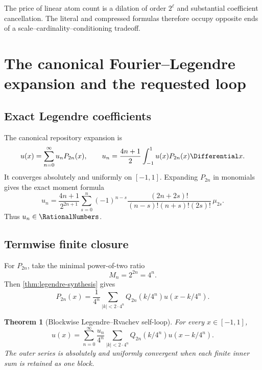 \documentclass[11pt,oneside]{article}
\numberwithin{equation}{section}
\newtheorem{theorem}{Theorem}[section]
\theoremstyle{definition}
\theoremstyle{remark}
\begin{document}
The price of linear atom count is a dilation of order $2^\ell$ and substantial
coefficient cancellation.  The literal and compressed formulas therefore
occupy opposite ends of a scale--cardinality--conditioning tradeoff.

\section{The canonical Fourier--Legendre expansion and the requested loop}
\label{sec:canonical-loop}

\subsection{Exact Legendre coefficients}

The canonical repository expansion is
\begin{equation}
 u(x)=\sum_{n=0}^{\infty}u_nP_{2n}(x),
 \qquad
 u_n=\frac{4n+1}{2}\int_{-1}^{1}u(x)P_{2n}(x)\Differential x.
 \label{eq:canonical-expansion}
\end{equation}
It converges absolutely and uniformly on $[-1,1]$.  Expanding $P_{2n}$ in
monomials gives the exact moment formula
\begin{equation}
 \boxed{
 u_n=\frac{4n+1}{2^{2n+1}}
 \sum_{s=0}^{n}(-1)^{n-s}
 \frac{(2n+2s)!}{(n-s)!(n+s)!(2s)!}\,\mu_{2s}.}
 \label{eq:un-moments}
\end{equation}
Thus $u_n\in\RationalNumbers$.

\begin{center}
\small

\end{center}

\subsection{Termwise finite closure}

For $P_{2n}$, take the minimal power-of-two ratio
\begin{equation}
 M_n=2^{2n}=4^n.
 \label{eq:Mn}
\end{equation}
Then \cref{thm:legendre-synthesis} gives
\begin{equation}
 P_{2n}(x)=\frac1{4^n}
 \sum_{|k|<2\cdot4^n}Q_{2n}(k/4^n)u(x-k/4^n).
 \label{eq:P2n-atomization}
\end{equation}

\begin{theorem}[Blockwise Legendre--Rvachev self-loop]
\label{thm:block-loop}
For every $x\in[-1,1]$,
\begin{equation}
 \boxed{
 u(x)=\sum_{n=0}^{\infty}\frac{u_n}{4^n}
 \sum_{|k|<2\cdot4^n}Q_{2n}(k/4^n)u(x-k/4^n).}
 \label{eq:block-loop}
\end{equation}
The outer series is absolutely and uniformly convergent when each finite inner
sum is retained as one block.
\end{theorem}
\end{document}
